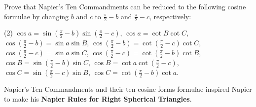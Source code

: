 \begin{tcolorbox}[title={Napier's Ten Right Spherical Triangle Commandments}]
    \vspace{-1em}
    
    \begin{question}
        Prove that Napier's Ten Commandments can be reduced to the following cosine formulae by changing $b$ and $c$ to $\frac{\pi}{2}-b$ and $\frac{\pi}{2}-c$, respectively:
        \begin{tasks}(2)
            \task $\displaystyle\cos a = \sin\left(\frac{\pi}{2}-b\right)\sin\left(\frac{\pi}{2}-c\right)$,
            \task $\displaystyle\cos a = \cot B \cot C$,
            \task $\displaystyle\cos \left(\frac{\pi}{2}-b\right) = \sin a \sin B$,
            \task $\displaystyle\cos \left(\frac{\pi}{2}-b\right) = \cot \left(\frac{\pi}{2}-c\right) \cot C$,
            \task $\displaystyle\cos \left(\frac{\pi}{2}-c\right) = \sin a \sin C$,
            \task $\displaystyle\cos \left(\frac{\pi}{2}-c\right) = \cot \left(\frac{\pi}{2}-b\right) \cot B$,
            \task $\displaystyle\cos B = \sin \left(\frac{\pi}{2}-b\right) \sin C$,
            \task $\displaystyle\cos B = \cot a \cot \left(\frac{\pi}{2}-c\right)$,
            \task $\displaystyle\cos C = \sin \left(\frac{\pi}{2}-c\right) \sin B$,
            \task $\displaystyle\cos C = \cot \left(\frac{\pi}{2}-b\right) \cot a$.
        \end{tasks}
        Napier's Ten Commandments and their ten cosine forms formulae inspired Napier to make his \textbf{Napier Rules for Right Spherical Triangles}.
    \end{question}
\end{tcolorbox}

